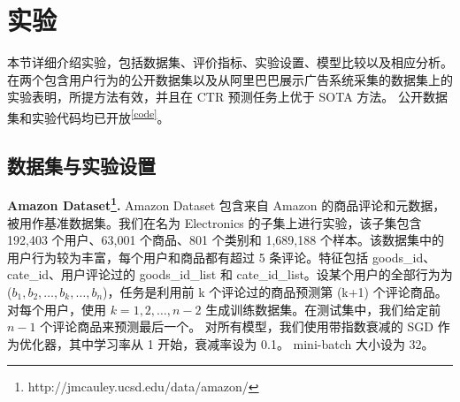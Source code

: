 \section{实验} \label{exp}

本节详细介绍实验，包括数据集、评价指标、实验设置、模型比较以及相应分析。
在两个包含用户行为的公开数据集以及从阿里巴巴展示广告系统采集的数据集上的实验表明，所提方法有效，并且在 CTR 预测任务上优于 SOTA 方法。
公开数据集和实验代码均已开放\textsuperscript{\ref{code}}。%

\subsection{数据集与实验设置}
\textbf{Amazon Dataset\footnote{http://jmcauley.ucsd.edu/data/amazon/}.}
Amazon Dataset 包含来自 Amazon 的商品评论和元数据，被用作基准数据集\cite{Amazon:AUC,AmazonData,ICCV_Amazon}。我们在名为 Electronics 的子集上进行实验，该子集包含 192,403 个用户、63,001 个商品、801 个类别和 1,689,188 个样本。该数据集中的用户行为较为丰富，每个用户和商品都有超过 5 条评论。特征包括 goods\_id、cate\_id、用户评论过的 goods\_id\_list 和 cate\_id\_list。设某个用户的全部行为为 ($b_1, b_2, \ldots, b_k, \ldots, b_n$)，任务是利用前 k 个评论过的商品预测第 (k+1) 个评论商品。
    对每个用户，使用 $k = 1, 2, \ldots, n - 2$ 生成训练数据集。在测试集中，我们给定前 $n-1$ 个评论商品来预测最后一个。
    对所有模型，我们使用带指数衰减的 SGD 作为优化器，其中学习率从 1 开始，衰减率设为 0.1。%
    mini-batch 大小设为 $32$。

